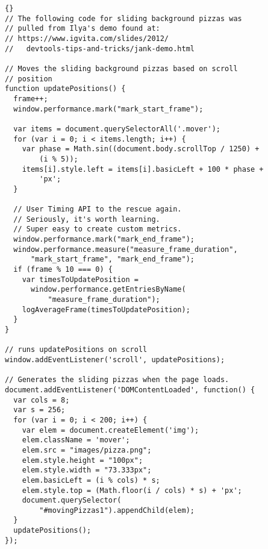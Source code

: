\documentclass[twoside]{article}
\begin{document}
\begin{lstlisting}{}
// The following code for sliding background pizzas was
// pulled from Ilya's demo found at:
// https://www.igvita.com/slides/2012/
//   devtools-tips-and-tricks/jank-demo.html

// Moves the sliding background pizzas based on scroll
// position
function updatePositions() {
  frame++;
  window.performance.mark("mark_start_frame");

  var items = document.querySelectorAll('.mover');
  for (var i = 0; i < items.length; i++) {
    var phase = Math.sin((document.body.scrollTop / 1250) +
        (i % 5));
    items[i].style.left = items[i].basicLeft + 100 * phase +
        'px';
  }

  // User Timing API to the rescue again. 
  // Seriously, it's worth learning.
  // Super easy to create custom metrics.
  window.performance.mark("mark_end_frame");
  window.performance.measure("measure_frame_duration",
      "mark_start_frame", "mark_end_frame");
  if (frame % 10 === 0) {
    var timesToUpdatePosition = 
      window.performance.getEntriesByName(
          "measure_frame_duration");
    logAverageFrame(timesToUpdatePosition);
  }
}

// runs updatePositions on scroll
window.addEventListener('scroll', updatePositions);

// Generates the sliding pizzas when the page loads.
document.addEventListener('DOMContentLoaded', function() {
  var cols = 8;
  var s = 256;
  for (var i = 0; i < 200; i++) {
    var elem = document.createElement('img');
    elem.className = 'mover';
    elem.src = "images/pizza.png";
    elem.style.height = "100px";
    elem.style.width = "73.333px";
    elem.basicLeft = (i % cols) * s;
    elem.style.top = (Math.floor(i / cols) * s) + 'px';
    document.querySelector(
        "#movingPizzas1").appendChild(elem);
  }
  updatePositions();
});
\end{lstlisting}
\end{document}
